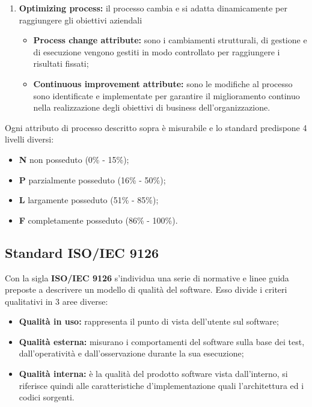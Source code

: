 \begin{enumerate}[label*=\arabic*]
\item \textbf{Optimizing process:} il processo cambia e si adatta dinamicamente per raggiungere gli obiettivi aziendali
		\begin{itemize}
			\item \textbf{Process change attribute:} sono i cambiamenti strutturali, di gestione e di esecuzione vengono gestiti in modo controllato per raggiungere i risultati fissati;
			\item \textbf{Continuous improvement attribute:} sono le modifiche al processo sono identificate e implementate per garantire il miglioramento continuo nella realizzazione degli obiettivi di \gls{business} dell'organizzazione.
		\end{itemize}

\end{enumerate}

\noindent Ogni attributo di processo descritto sopra è misurabile e lo standard predispone 4 livelli diversi:
\begin{itemize}[label={}]
	\item \textbf{N} non posseduto (0\% - 15\%);
	\item \textbf{P} parzialmente posseduto (16\% - 50\%);
	\item \textbf{L} largamente posseduto (51\% - 85\%);
	\item \textbf{F} completamente posseduto (86\% - 100\%).
\end{itemize}

\subsection{Standard ISO/IEC 9126} \label{9126}
Con la sigla \textbf{ISO/IEC 9126} s'individua una serie di normative e linee guida preposte a descrivere un modello di qualità del software.
Esso divide i criteri qualitativi in 3 aree diverse:
\begin{itemize}

	\item \textbf{Qualità in uso:} rappresenta il punto di vista dell'utente sul software;
	\item \textbf{Qualità esterna:} misurano i comportamenti del software sulla base dei test, dall'operatività e dall'osservazione durante la sua esecuzione;
	\item \textbf{Qualità interna:} è la qualità del prodotto software vista dall'interno, si riferisce quindi alle caratteristiche d'implementazione quali l'architettura ed i codici sorgenti.
\end{itemize}

